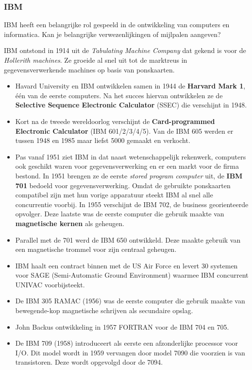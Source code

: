\documentclass[../main.tex]{subfiles}
\begin{document}
\subsubsection{IBM}
\begin{question}
IBM heeft een belangrijke rol gespeeld in de ontwikkeling van computers en informatica. Kan je belangrijke verwezenlijkingen of mijlpalen aangeven?
\end{question}
\begin{solution}
IBM ontstond in 1914 uit de \emph{Tabulating  Machine  Company} dat gekend is voor de \emph{Hollerith machines}. Ze groeide al snel uit tot de marktreus in gegevensverwerkende machines op basis van ponskaarten.
\begin{itemize}
	\item Havard University en IBM ontwikkelen samen in 1944 de \textbf{Harvard Mark 1}, \'e\'en van de eerste computers. Na het succes hiervan ontwikkelen ze de \textbf{Selective Sequence Electronic Calculator} (SSEC) die verschijnt in 1948.
	\item Kort na de tweede wereldoorlog verschijnt de \textbf{Card-programmed Electronic Calculator} (IBM 601/2/3/4/5). Van de IBM 605 werden er tussen 1948 en 1985 maar liefst 5000 gemaakt en verkocht.
	\item Pas vanaf 1951 ziet IBM in dat naast wetenschappelijk rekenwerk, computers ook geschikt waren voor gegevensverwerking en er een markt voor de firma bestond. In 1951 brengen ze de eerste \emph{stored program computer} uit, de \textbf{IBM 701} bedoeld voor gegevensverwerking. Omdat de gebruikte ponskaarten compatibel zijn met hun vorige apparatuur steekt IBM al snel alle concurrentie voorbij. In 1955 verschijnt de IBM 702, de business georienteerde opvolger. Deze laatste was de eerste computer die gebruik maakte van \textbf{magnetische kernen} als geheugen.
	\item Parallel met de 701 werd de IBM 650 ontwikkeld. Deze maakte gebruik van een magnetische trommel voor zijn centraal geheugen.
	\item IBM haalt een contract binnen met de US Air Force en levert 30 systemen voor SAGE (Semi-Automatic Ground Environment) waarmee IBM concurrent UNIVAC voorbijsteekt.
	\item De IBM 305 RAMAC (1956) was de eerste computer die gebruik maakte van bewegende-kop magnetische schrijven als secundaire opslag.
	\item John Backus ontwikkeling in 1957 FORTRAN voor de IBM 704 en 705.
	\item De IBM 709 (1958) introduceert als eerste een afzonderlijke processor voor I/O. Dit model wordt in 1959 vervangen door model 7090 die voorzien is van transistoren. Deze wordt opgevolgd door de 7094.

\end{itemize}
\end{solution}
\end{document}
